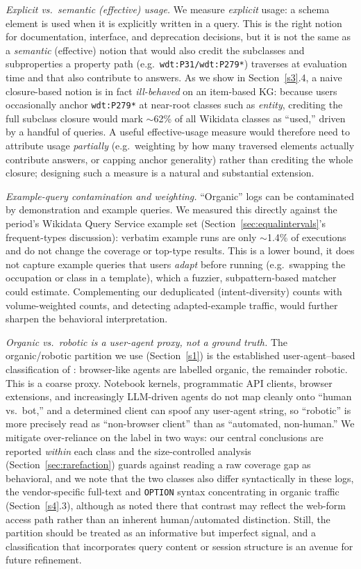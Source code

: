 \documentclass[sw]{iosart2x}
\begin{document}
\emph{Explicit vs.\ semantic (effective) usage.} We measure \emph{explicit} usage: a schema element is used when it is explicitly written in a query. This is the right notion for documentation, interface, and deprecation decisions, but it is not the same as a \emph{semantic} (effective) notion that would also credit the subclasses and subproperties a property path (e.g.\ \texttt{wdt:P31/wdt:P279*}) traverses at evaluation time and that also contribute to answers. As we show in Section~\ref{s3}.4, a naive closure-based notion is in fact \emph{ill-behaved} on an item-based KG: because users occasionally anchor \texttt{wdt:P279*} at near-root classes such as \emph{entity}, crediting the full subclass closure would mark $\sim$62\% of all Wikidata classes as ``used,'' driven by a handful of queries. A useful effective-usage measure would therefore need to attribute usage \emph{partially} (e.g.\ weighting by how many traversed elements actually contribute answers, or capping anchor generality) rather than crediting the whole closure; designing such a measure is a natural and substantial extension.

\emph{Example-query contamination and weighting.} ``Organic'' logs can be contaminated by demonstration and example queries. We measured this directly against the period's Wikidata Query Service example set (Section~\ref{sec:equalintervals}'s frequent-types discussion): verbatim example runs are only $\sim$1.4\% of executions and do not change the coverage or top-type results. This is a lower bound, it does not capture example queries that users \emph{adapt} before running (e.g.\ swapping the occupation or class in a template), which a fuzzier, subpattern-based matcher could estimate. Complementing our deduplicated (intent-diversity) counts with volume-weighted counts, and detecting adapted-example traffic, would further sharpen the behavioral interpretation.

\emph{Organic vs.\ robotic is a user-agent proxy, not a ground truth.} The organic/robotic partition we use (Section~\ref{s1}) is the established user-agent--based classification of \cite{malyshev2018getting,bielefeldt2018practical}: browser-like agents are labelled organic, the remainder robotic. This is a coarse proxy. Notebook kernels, programmatic API clients, browser extensions, and increasingly LLM-driven agents do not map cleanly onto ``human vs.\ bot,'' and a determined client can spoof any user-agent string, so ``robotic'' is more precisely read as ``non-browser client'' than as ``automated, non-human.'' We mitigate over-reliance on the label in two ways: our central conclusions are reported \emph{within} each class and the size-controlled analysis (Section~\ref{sec:rarefaction}) guards against reading a raw coverage gap as behavioral, and we note that the two classes also differ syntactically in these logs, the vendor-specific full-text and \texttt{OPTION} syntax concentrating in organic traffic (Section~\ref{s4}.3), although as noted there that contrast may reflect the web-form access path rather than an inherent human/automated distinction. Still, the partition should be treated as an informative but imperfect signal, and a classification that incorporates query content or session structure is an avenue for future refinement.
\end{document}
